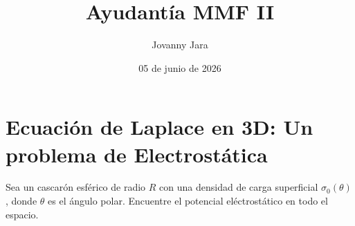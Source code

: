 \documentclass[11pt]{article}
\title{Ayudantía MMF II}
\author{Jovanny Jara}
\date{05 de junio de 2026}
\theoremstyle{definition}
\numberwithin{equation}{section}
\begin{document}
\maketitle

\section{Ecuación de Laplace en 3D: Un problema de Electrostática}

\begin{Exercise*}[title={Ejemplo 3.9}, name={}, origin={Griffiths, Introduction to Electrodynamics}]
Sea un cascarón esférico de radio $R$ con una densidad de carga superficial $\sigma_0(\theta)$, donde $\theta$ es el ángulo polar. Encuentre el potencial eléctrostático en todo el espacio.
\end{Exercise*}
\end{document}
